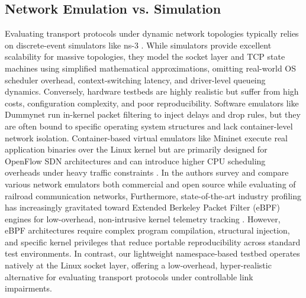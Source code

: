 \documentclass[conference]{IEEEtran}
\begin{document}
\subsection{Network Emulation vs. Simulation}
Evaluating transport protocols under dynamic network topologies typically relies on discrete-event simulators like ns-3 \cite{henderson2008ns3}. While simulators provide excellent scalability for massive topologies, they model the socket layer and TCP state machines using simplified mathematical approximations, omitting real-world OS scheduler overhead, context-switching latency, and driver-level queueing dynamics. Conversely, hardware testbeds are highly realistic but suffer from high costs, configuration complexity, and poor reproducibility. Software emulators like Dummynet \cite{rizzo1997dummynet} run in-kernel packet filtering to inject delays and drop rules, but they are often bound to specific operating system structures and lack container-level network isolation. Container-based virtual emulators like Mininet \cite{heller2010mininet} execute real application binaries over the Linux kernel but are primarily designed for OpenFlow SDN architectures and can introduce higher CPU scheduling overheads under heavy traffic constraints \cite{nussbaum2009linux}. In \cite{net_ems_comparison} the authors survey and compare various network emulators both commercial and open source while evaluating of railroad communication networks, Furthermore, state-of-the-art industry profiling has increasingly gravitated toward Extended Berkeley Packet Filter (eBPF) engines for low-overhead, non-intrusive kernel telemetry tracking \cite{Cassagnes2020eBPF}. However, eBPF architectures require complex program compilation, structural injection, and specific kernel privileges that reduce portable reproducibility across standard test environments. In contrast, our lightweight namespace-based testbed operates natively at the Linux socket layer, offering a low-overhead, hyper-realistic alternative for evaluating transport protocols under controllable link impairments.
\end{document}
